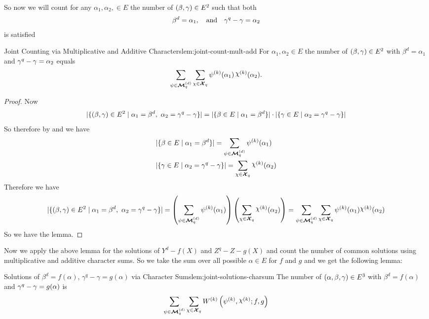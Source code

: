 So now we will count for any $\alpha_1,\alpha_2,\in E$ the number of $(\beta,\gamma)\in E^2$ such that both $$\beta^d=\alpha_1,\quad\text{and}\quad \gamma^q-\gamma=\alpha_2$$ is satisfied
\begin{lemma}{Joint Counting via Multiplicative and Additive Characters}{lem:joint-count-mult-add}
  For $\alpha_1,\alpha_2\in E$ the number of $(\beta,\gamma)\in E^2$ with $\beta^d=\alpha_1$ and $\gamma^q-\gamma=\alpha_2$ equals $$\sum_{\psi\in\Mq^{(d)}}\sum_{\oldchi\in\Xq}\psi^{(k)}(\alpha_1)\,\chi^{(k)}(\alpha_2).$$
\end{lemma}
\begin{proof}
  Now $$|\{(\beta,\gamma)\in E^2\mid \alpha_1=\beta^d,\ \alpha_2=\gamma^q-\gamma\}|=|\{\beta\in E\mid \alpha_1=\beta^d\}|\cdot |\{\gamma\in E\mid \alpha_2=\gamma^q-\gamma\}|$$So therefore by \DthPowerCountlem and \FrobeniusCountAddlem we have \begin{align*}
    & |\{\beta\in E\mid \alpha_1=\beta^d\}| = \sum_{\psi\in\Mq^{(d)}}\psi^{(k)}(\alpha_1)\\ 
    & |\{\gm\in E\mid \alpha_2=\gm^q-\gm\}| = \sum_{\oldchi\in\Xq}\chi^{(k)}(\alpha_2)
  \end{align*}Therefore we have $$|\{(\beta,\gm)\in E^2\mid \alpha_1=\beta^d,\ \alpha_2=\gm^q-\gm\}|  = \lt( \sum_{\psi\in\Mq^{(d)}}\psi^{(k)}(\alpha_1)\rt)\lt(\sum_{\oldchi\in\Xq}\chi^{(k)}(\alpha_2)\rt) = \sum_{\psi\in\Mq^{(d)}}\sum_{\oldchi\in\Xq}\psi^{(k)}(\alpha_1)\chi^{(k)}(\alpha_2)$$
    So we have the lemma. 
\end{proof}

Now we apply the above lemma for the solutions of $Y^d-f(X)$ and $Z^q-Z-g(X)$ and count the number of common solutions using multiplicative and additive character sums. So we take the sum over all possible $\alpha\in E$ for $f$ and $g$ and we get the following lemma:
\begin{lemma}{Solutions of $\beta^d=f(\alpha)$, $\gamma^q-\gamma=g(\alpha)$ via Character Sums}{lem:joint-solutions-charsum}
  The number of $(\alpha,\beta,\gamma)\in E^3$ with $\beta^d=f(\alpha)$ and $\gamma^q-\gamma=g(\alpha)$ is $$\sum_{\psi\in\Mq^{(d)}}\sum_{\oldchi\in\Xq}\Wmixl{k}{f}{g}$$
\end{lemma}


